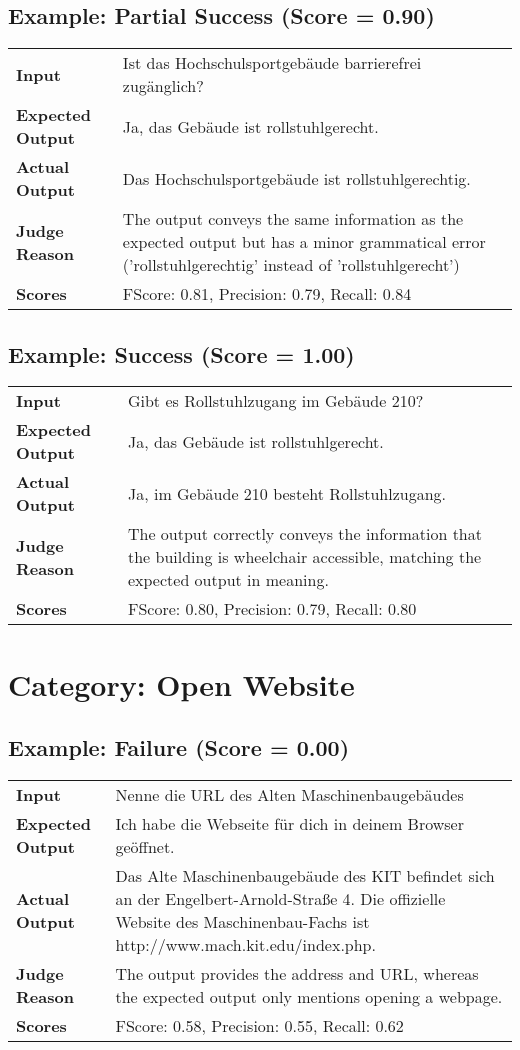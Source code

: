 \documentclass{article}
\begin{document}
\subsection*{Example: Partial Success (Score = 0.90)}
\begin{longtable}{p{} p{}}
\textbf{Input} & Ist das Hochschulsportgebäude barrierefrei zugänglich? \\
\textbf{Expected Output} & Ja, das Gebäude ist rollstuhlgerecht. \\
\textbf{Actual Output} & Das Hochschulsportgebäude ist rollstuhlgerechtig. \\
\textbf{Judge Reason} & The output conveys the same information as the expected output but has a minor grammatical error ('rollstuhlgerechtig' instead of 'rollstuhlgerecht') \\
\textbf{Scores} & FScore: 0.81, Precision: 0.79, Recall: 0.84 \\
\end{longtable}
\subsection*{Example: Success (Score = 1.00)}
\begin{longtable}{p{} p{}}
\textbf{Input} & Gibt es Rollstuhlzugang im Gebäude 210? \\
\textbf{Expected Output} & Ja, das Gebäude ist rollstuhlgerecht. \\
\textbf{Actual Output} & Ja, im Gebäude 210 besteht Rollstuhlzugang. \\
\textbf{Judge Reason} & The output correctly conveys the information that the building is wheelchair accessible, matching the expected output in meaning. \\
\textbf{Scores} & FScore: 0.80, Precision: 0.79, Recall: 0.80 \\
\end{longtable}
\section*{Category: Open Website}
\subsection*{Example: Failure (Score = 0.00)}
\begin{longtable}{p{} p{}}
\textbf{Input} & Nenne die URL des Alten Maschinenbaugebäudes \\
\textbf{Expected Output} & Ich habe die Webseite für dich in deinem Browser geöffnet. \\
\textbf{Actual Output} & Das Alte Maschinenbaugebäude des KIT befindet sich an der Engelbert-Arnold-Straße 4. Die offizielle Website des Maschinenbau-Fachs ist http://www.mach.kit.edu/index.php. \\
\textbf{Judge Reason} & The output provides the address and URL, whereas the expected output only mentions opening a webpage. \\
\textbf{Scores} & FScore: 0.58, Precision: 0.55, Recall: 0.62 \\
\end{longtable}
\end{document}
